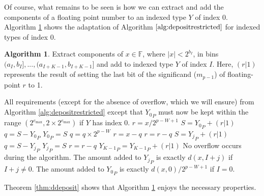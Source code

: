 \documentclass[12pt]{article}
\providecommand{\F}{\ensuremath{\mathbb{F}}}
\providecommand{\max}{\ensuremath{\text{max}}}
\providecommand{\To}{\ensuremath{\text{ to }}}
\theoremstyle{definition}
\newtheorem{alg}{Algorithm}[section]
\numberwithin{equation}{section}
\numberwithin{figure}{section}
\begin{document}
      Of course, what remains to be seen is how we can extract and add the components of a floating point number to an indexed type $Y$ of index 0. Algorithm \ref{alg:deposit} shows the adaptation of Algorithm $\ref{alg:depositrestricted}$ for indexed types of index 0.

      \begin{samepage}
      \begin{alg}
        Extract components of $x \in \F$, where $|x| < 2^{b_I}$, in bins $(a_I, b_I], ..., (a_{I + K - 1}, b_{I + K - 1}]$ and add to indexed type $Y$ of index $I$. Here, $(r | 1)$ represents the result of setting the last bit of the significand ($m_{p - 1}$) of floating-point $r$ to 1.
        \begin{algorithmic}[1]
          \Require
            \Statex All requirements (except for the absence of overflow, which we will ensure) from Algorithm \ref{alg:depositrestricted} except that ${Y_0}_P$ must now be kept within the range $(2^{e_{\max}}, 2 \times 2^{e_{\max}})$ if $Y$ has index 0.
              \State $r = x / 2^{p - W + 1}$ \label{alg:deposit:scaler}
              \State $S = {Y_0}_P + (r | 1)$ \label{alg:deposit:formS}
              \State $q = S - {Y_0}_P$ \label{alg:deposit:formq}
              \State ${Y_0}_P = S$
              \State $q = q \times 2^{p - W}$ \label{alg:deposit:scaleq}
              \State $r = x - q$ \label{alg:deposit:formr}
              \State $r = r - q$ \label{alg:deposit:formragain}
              \For{$j = 1 \To (K - 2)$}
                \State $S = {Y_j}_P + (r | 1)$
                \State $q = S - {Y_j}_P$
                \State ${Y_j}_P = S$
                \State $r = r - q$
              \EndFor
              \State ${Y_{K - 1}}_P = {Y_{K - 1}}_P + (r | 1)$
            \Else
              \State{} \label{alg:deposit:callrestricted}
            \EndIf
          \EndFunction
          \Ensure
            \Statex No overflow occurs during the algorithm.
            \Statex The amount added to ${Y_j}_P$ is exactly $d(x, I + j)$ if $I + j \neq 0$.
            \Statex The amount added to ${Y_0}_P$ is exactly $d(x, 0)/2^{p - W + 1}$ if $I = 0$.
        \end{algorithmic}
        \label{alg:deposit}
      \end{alg}
      \end{samepage}

      Theorem \ref{thm:ddeposit} shows that Algorithm \ref{alg:deposit} enjoys the necessary properties.
\end{document}
